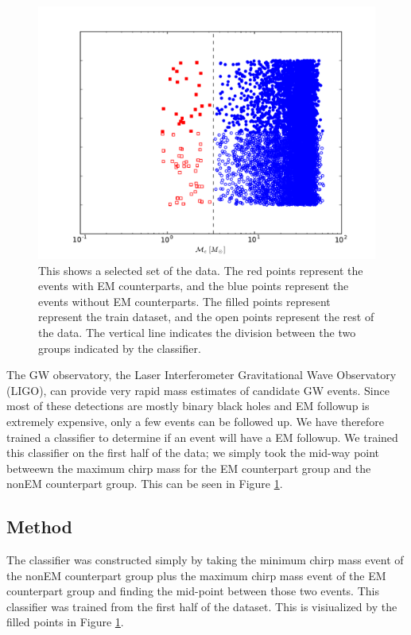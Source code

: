 \begin{figure}[ht]
  \includegraphics[width=\columnwidth]{img/classifier_comparison}
  \caption{This shows a selected set of the data. The red points represent the events with EM counterparts, and the blue points represent the events without EM counterparts. The filled points represent represent the train dataset, and the open points represent the rest of the data. The vertical line indicates the division between the two groups indicated by the classifier.}
  \label{fig:class}
\end{figure}

The GW observatory, the Laser Interferometer Gravitational Wave Observatory (LIGO), can provide very rapid mass estimates of candidate GW events. Since most of these detections are mostly binary black holes and EM followup is extremely expensive, only a few events can be followed up. We have therefore trained a classifier to determine if an event will have a EM followup. We trained this classifier on the first half of the data; we simply took the mid-way point betweewn the maximum chirp mass for the EM counterpart group and the nonEM counterpart group. This can be seen in Figure \ref{fig:class}.


\subsection{Method}
The classifier was constructed simply by taking the minimum chirp mass event of the nonEM counterpart group plus the maximum chirp mass event of the EM counterpart group and finding the mid-point between those two events. This classifier was trained from the first half of the dataset. This is visiualized by the filled points in Figure \ref{fig:class}.

